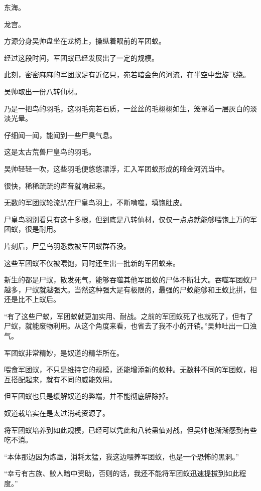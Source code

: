 
\begin{this_body}

东海。

龙宫。

方源分身吴帅盘坐在龙椅上，操纵着眼前的军团蚁。

经过这段时间，军团蚁已经发展出了一定的规模。

此刻，密密麻麻的军团蚁足有近亿只，宛若暗金色的河流，在半空中盘旋飞绕。

吴帅取出一份八转仙材。

乃是一把鸟的羽毛，这羽毛宛若石质，一丝丝的毛栩栩如生，笼罩着一层灰白的淡淡光晕。

仔细闻一闻，能闻到一些尸臭气息。

这是太古荒兽尸皇鸟的羽毛。

吴帅轻轻一吹，这些羽毛便悠悠漂浮，汇入军团蚁形成的暗金河流当中。

很快，稀稀疏疏的声音就响起来。

无数的军团蚁轮流趴在尸皇鸟羽上，不断啃噬，填饱肚皮。

尸皇鸟羽别看只有这十多根，但到底是八转仙材，仅仅一点点就能够喂饱上万的军团蚁，很是耐用。

片刻后，尸皇鸟羽悉数被军团蚁群吞没。

这些军团蚁不仅被喂饱，同时还生出一批新的军团蚁来。

新生的都是尸蚁，散发死气，能够吞噬其他军团蚁的尸体不断壮大。吞噬军团蚁尸越多，尸蚁就越强大。当然这种强大是有极限的，最强的尸蚁能够和王蚁比拼，但还是比不上蚁后。

“有了这些尸蚁，军团蚁就更加实用、耐战。之前的军团蚁死了也就死了，但有了尸蚁，就能废物利用。从这个角度来看，也省去了我不小的开销。”吴帅吐出一口浊气。

军团蚁非常精妙，是奴道的精华所在。

喂食军团蚁，不只是维持它的规模，还能增添新的蚁种。无数种不同的军团蚁，相互搭配起来，就有不同的威能效用。

但军团蚁也只是缓解奴道的弊端，并不能彻底解除掉。

奴道栽培实在是太过消耗资源了。

将军团蚁培养到如此规模，已经可以凭此和八转蛊仙对战，但吴帅也渐渐感到有些吃不消。

“本体那边因为炼蛊，消耗太猛，我这边喂养军团蚁，也是一个恐怖的黑洞。”

“幸亏有古族、鲛人暗中资助，否则的话，我还不能将军团蚁迅速提拔到如此程度。”


\end{this_body}
